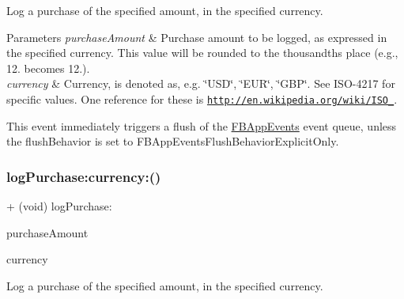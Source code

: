 Log a purchase of the specified amount, in the specified currency.


\begin{DoxyParams}{Parameters}
{\em purchase\+Amount} & Purchase amount to be logged, as expressed in the specified currency. This value will be rounded to the thousandths place (e.\+g., 12. becomes 12.).\\
\hline
{\em currency} & Currency, is denoted as, e.\+g. \char`\"{}\+U\+S\+D\char`\"{}, \char`\"{}\+E\+U\+R\char`\"{}, \char`\"{}\+G\+B\+P\char`\"{}. See I\+S\+O-\/4217 for specific values. One reference for these is \href{http://en.wikipedia.org/wiki/ISO_4217}{\tt http\+://en.\+wikipedia.\+org/wiki/\+I\+S\+O\+\_}.\\
\hline
\end{DoxyParams}
This event immediately triggers a flush of the {\ttfamily \hyperlink{interfaceFBAppEvents}{F\+B\+App\+Events}} event queue, unless the {\ttfamily flush\+Behavior} is set to {\ttfamily F\+B\+App\+Events\+Flush\+Behavior\+Explicit\+Only}. \mbox{\label{interfaceFBAppEvents_a871b481d919104f7dbb67247b682e0fa}} 
\subsubsection{\texorpdfstring{log\+Purchase\+:currency\+:()}{logPurchase:currency:()}\hspace{0.1cm}{\footnotesize\ttfamily [4/5]}}
{\footnotesize\ttfamily + (void) log\+Purchase\+: \begin{DoxyParamCaption}\item[{(double)}]{purchase\+Amount }\item[{currency:(N\+S\+String $\ast$)}]{currency }\end{DoxyParamCaption}}

Log a purchase of the specified amount, in the specified currency.


